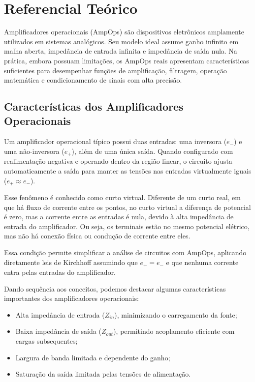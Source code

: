 \section{Referencial Teórico}

Amplificadores operacionais (AmpOps) são dispositivos eletrônicos amplamente utilizados em sistemas analógicos. Seu modelo ideal assume ganho infinito em malha aberta, impedância de entrada infinita e impedância de saída nula. Na prática, embora possuam limitações, os AmpOps reais apresentam características suficientes para desempenhar funções de amplificação, filtragem, operação matemática e condicionamento de sinais com alta precisão.

\subsection{Características dos Amplificadores Operacionais}

Um amplificador operacional típico possui duas entradas: uma inversora ($e_-$) e uma não-inversora ($e_+$), além de uma única saída. Quando configurado com realimentação negativa e operando dentro da região linear, o circuito ajusta automaticamente a saída para manter as tensões nas entradas virtualmente iguais ($e_+ \approx e_-$). 

Esse fenômeno é conhecido como curto virtual. Diferente de um curto real, em que há fluxo de corrente entre os pontos, no curto virtual a diferença de potencial é zero, mas a corrente entre as entradas é nula, devido à alta impedância de entrada do amplificador. Ou seja, os terminais estão no mesmo potencial elétrico, mas não há conexão física ou condução de corrente entre eles.

Essa condição permite simplificar a análise de circuitos com AmpOps, aplicando diretamente leis de Kirchhoff assumindo que $e_+ = e_-$ e que nenhuma corrente entra pelas entradas do amplificador.

Dando sequência aos conceitos, podemos destacar algumas características importantes dos amplificadores operacionais:

\begin{itemize}
    \item Alta impedância de entrada ($Z_{in}$), minimizando o carregamento da fonte;
    \item Baixa impedância de saída ($Z_{out}$), permitindo acoplamento eficiente com cargas subsequentes;
    \item Largura de banda limitada e dependente do ganho;
    \item Saturação da saída limitada pelas tensões de alimentação.
\end{itemize}

